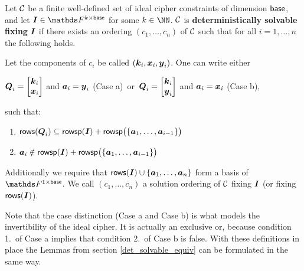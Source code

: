 \begin{defn}
\label{def_det_solvable_ic}
    Let $\mathcal{C}$ be a finite well-defined set of ideal cipher constraints of dimension $\mathsf{base}$,
    and let $\I \in \F^{k \times \base}$ for some $k \in \NN$.
    $\mathcal{C}$ is \textbf{deterministically solvable fixing} $\boldsymbol{I}$
    if there exists an ordering $(c_1, \dots, c_n)$ of $\mathcal{C}$
    such that for all $i=1, \dots, n$ the following holds.
    
    Let the components of $c_i$ be called $(\boldsymbol k_i, \boldsymbol x_i, \boldsymbol y_i)$.
    One can write either
    \vspace{-4mm}
    \begin{center}
    $\boldsymbol{Q}_i = \begin{bmatrix}\boldsymbol k_i \\ \boldsymbol x_i\end{bmatrix}$ and $\boldsymbol a_i = \boldsymbol y_i$ (Case a) \,or\, 
    $\boldsymbol{Q}_i = \begin{bmatrix}\boldsymbol k_i \\ \boldsymbol y_i\end{bmatrix}$ and $\boldsymbol a_i = \boldsymbol x_i$ (Case b),
    \end{center}
    \vspace{-4mm}
    such that:
    
    \begin{enumerate}
    \item
        \label{solvable1_ic}
        $\mathsf{rows}(\boldsymbol{Q}_i) \subseteq \mathsf{rowsp}(\boldsymbol{I}) + \mathsf{rowsp}\big(\{\boldsymbol a_1, \dots, \boldsymbol a_{i-1} \}\big)$
    \item
        \label{solvable2_ic}
        $\boldsymbol a_i \notin \mathsf{rowsp}(\boldsymbol{I}) + \mathsf{rowsp}\big(\{\boldsymbol a_1, \dots, \boldsymbol a_{i-1} \}\big)$
    \end{enumerate}
    Additionally we require that $\mathsf{rows}(\boldsymbol{I}) \cup \{\boldsymbol a_1, \dots, \boldsymbol a_n\}$ form a basis of $\F^{1\times\base}$.
    We call $(c_1, \dots, c_n)$ a solution ordering of $\mathcal{C}$ fixing $\boldsymbol{I}$ (or fixing $\mathsf{rows}(\boldsymbol{I})$).
\end{defn}

Note that the case distinction (Case a and Case b) is what models the invertibility of the ideal cipher.
It is actually an exclusive or,
because condition 1.~of Case a implies that condition 2.~of Case b is false.
With these definitions in place the Lemmas from section \ref{det_solvable_equiv} can be formulated in the same way.


